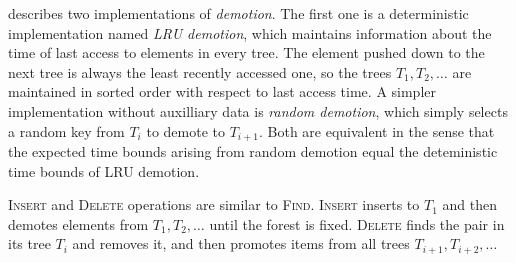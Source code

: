 \cite{martel} describes two implementations of \textit{demotion}.
The first one is a deterministic implementation named \textit{LRU demotion},
which maintains information about the time of last access to elements
in every tree. The element pushed down to the next tree is always the least
recently accessed one, so the trees $T_1,T_2,\ldots$ are maintained in sorted
order with respect to last access time.
A simpler implementation without auxilliary data is \textit{random demotion},
which simply selects a random key from $T_i$ to demote to $T_{i+1}$.
Both are equivalent in the sense that the expected time bounds arising
from random demotion equal the deteministic time bounds of LRU demotion.

\textsc{Insert} and \textsc{Delete} operations are similar to \textsc{Find}.
\textsc{Insert} inserts to $T_1$ and then demotes elements from $T_1,T_2,\ldots$
until the forest is fixed.
\textsc{Delete} finds the pair in its tree $T_i$ and removes it, and
then promotes items from all trees $T_{i+1},T_{i+2},\ldots$

